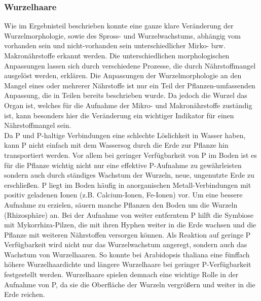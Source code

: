 \documentclass[10pt,a4paper]{article}
\begin{document}
	\subsubsection{Wurzelhaare}
	Wie im Ergebnisteil beschrieben konnte eine ganze klare Veränderung der Wurzelmorphologie, sowie des Spross- und Wurzelwachstums, abhängig vom vorhanden sein und nicht-vorhanden sein unterschiedlicher Mirko- bzw. Makronährstoffe erkannt werden. Die unterschiedlichen morphologischen Anpassungen lassen sich durch verschiedene Prozesse, die durch Nährstoffmangel ausgelöst werden, erklären. Die Anpassungen der Wurzelmorphologie an den Mangel eines oder mehrerer Nährstoffe ist nur ein Teil der Pflanzen-umfassenden Anpassung, die in Teilen bereits beschrieben wurde. Da jedoch die Wurzel das Organ ist, welches für die Aufnahme der Mikro- und Makronährstoffe zuständig ist, kann besonders hier die Veränderung ein wichtiger Indikator für einen Nährstoffmangel sein.\\
	Da P und P-haltige Verbindungen eine schlechte Löslichkeit in Wasser haben, kann P nicht einfach mit dem Wassersog durch die Erde zur Pflanze hin transportiert werden. Vor allem bei geringer Verfügbarkeit von P im Boden ist es für die Pflanze wichtig nicht nur eine effektive P-Aufnahme zu gewährleisten sondern auch durch ständiges Wachstum der Wurzeln, neue, ungenutzte Erde zu erschließen\cite{Taiz}. P liegt im Boden häufig in anorganischen Metall-Verbindungen mit positiv geladenen Ionen (z.B. Calcium-Ionen, Fe-Ionen) vor. Um eine bessere Aufnahme zu erzielen, säuern manche Pflanzen den Boden um die Wurzeln (Rhizosphäre) an.  Bei der Aufnahme von weiter entferntem P hilft die Symbiose mit Mykorrhiza-Pilzen, die mit ihren Hyphen weiter in die Erde wachsen und die Pflanze mit weiteren Nährstoffen versorgen können\cite{Taiz}. Als Reaktion auf geringe P Verfügbarkeit wird nicht nur das Wurzelwachstum angeregt, sondern auch das Wachstum von Wurzelhaaren. So konnte bei Arabidopsis thaliana eine fünffach höhere Wurzelhaardichte und längere Wurzelhaare bei geringer P-Verfügbarkeit festgestellt werden\cite{Schaaf;}. Wurzelhaare spielen demnach eine wichtige Rolle in der Aufnahme von P, da sie die Oberfläche der Wurzeln vergrößern und weiter in die Erde reichen.\\
\end{document}
